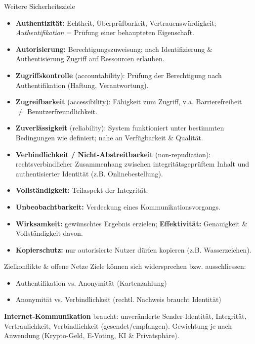 \documentclass[a4paper, fontsize=7pt]{scrartcl}
\begin{document}
\begin{mainbox}{Weitere Sicherheitsziele}
\begin{itemize}
    \item \textbf{Authentizität:} Echtheit, Überprüfbarkeit, Vertrauenswürdigkeit;
          \emph{Authentifikation} = Prüfung einer behaupteten Eigenschaft.
    \item \textbf{Autorisierung:} Berechtigungszuweisung; nach Identifizierung \&
          Authentisierung Zugriff auf Ressourcen erlauben.
    \item \textbf{Zugriffskontrolle} (accountability): Prüfung der Berechtigung nach
          Authentifikation (Haftung, Verantwortung).
    \item \textbf{Zugreifbarkeit} (accessibility): Fähigkeit zum Zugriff, v.a.
          Barrierefreiheit $\neq$ Benutzerfreundlichkeit.
    \item \textbf{Zuverlässigkeit} (reliability): System funktioniert unter
          bestimmten Bedingungen wie definiert; nahe an Verfügbarkeit \& Qualität.
    \item \textbf{Verbindlichkeit / Nicht-Abstreitbarkeit} (non-repudiation):
          rechtsverbindlicher Zusammenhang zwischen integritätsgeprüftem Inhalt und
          authentisierter Identität (z.B. Onlinebestellung).
    \item \textbf{Vollständigkeit:} Teilaspekt der Integrität.
    \item \textbf{Unbeobachtbarkeit:} Verdeckung eines Kommunikationsvorgangs.
    \item \textbf{Wirksamkeit:} gewünschtes Ergebnis erzielen;
          \textbf{Effektivität:} Genauigkeit \& Vollständigkeit davon.
    \item \textbf{Kopierschutz:} nur autorisierte Nutzer dürfen kopieren
          (z.B. Wasserzeichen).
\end{itemize}
\end{mainbox}

\begin{subbox}{Zielkonflikte \& offene Netze}
Ziele können sich widersprechen bzw. ausschliessen:
\begin{itemize}
    \item Authentifikation vs. Anonymität (Kartenzahlung)
    \item Anonymität vs. Verbindlichkeit (rechtl. Nachweis braucht Identität)
\end{itemize}
\textbf{Internet-Kommunikation} braucht: unveränderte Sender-Identität, Integrität,
Vertraulichkeit, Verbindlichkeit (gesendet/empfangen).
Gewichtung je nach Anwendung (Krypto-Geld, E-Voting, KI \& Privatsphäre).
\end{subbox}
\end{document}
